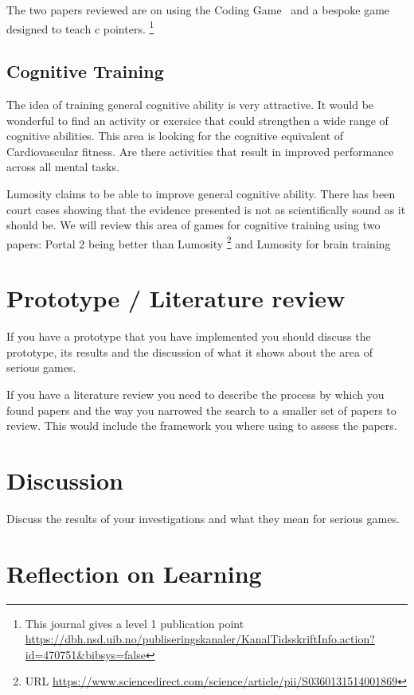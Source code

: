 \documentclass{article}
\begin{document}
The two papers reviewed are on using the Coding Game~\cite{butt2016} and a bespoke game designed to teach c pointers. \cite{Yassine2017}\footnote{ This journal gives a level 1 publication point 
\url{https://dbh.nsd.uib.no/publiseringskanaler/KanalTidsskriftInfo.action?id=470751&bibsys=false}}


\subsection{Cognitive Training}
The idea of training general cognitive ability is very attractive.  It would be wonderful to find an activity or exersice that could strengthen a wide range of cognitive abilities.  This area is looking for the cognitive equivalent of Cardiovascular fitness.  Are there activities that result in improved performance across all mental tasks. 

Lumosity claims to be able to improve general cognitive ability.  There has been court cases showing that the evidence presented is not as scientifically sound as it should be.  We will review this area of games for cognitive training using two papers:
Portal 2 being better than Lumosity \cite{shute2015}\footnote{URL \url{https://www.sciencedirect.com/science/article/pii/S0360131514001869}} and Lumosity for brain training \cite{hardy2015}




\section{Prototype / Literature review}

If you have a prototype that you have implemented you should discuss the prototype, its results and the discussion of what it shows about the area of serious games.

If you have a literature review you need to describe the process by which you found papers and the way you narrowed the search to a smaller set of papers to review.  This would include the framework you where using to assess the papers.


\section{Discussion}

Discuss the results of your investigations and what they mean for serious games.

\section{Reflection on Learning}
\end{document}
